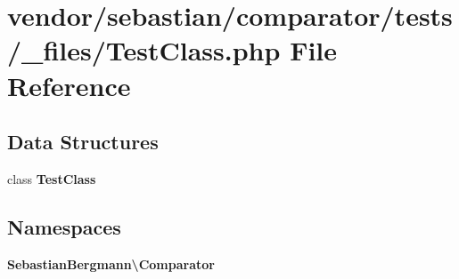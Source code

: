 \section{vendor/sebastian/comparator/tests/\+\_\+files/\+Test\+Class.php File Reference}
\label{_test_class_8php}
\subsection*{Data Structures}
\begin{DoxyCompactItemize}
\item 
class {\bf Test\+Class}
\end{DoxyCompactItemize}
\subsection*{Namespaces}
\begin{DoxyCompactItemize}
\item 
 {\bf Sebastian\+Bergmann\textbackslash{}\+Comparator}
\end{DoxyCompactItemize}
